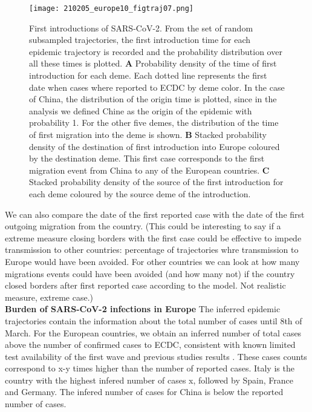 \begin{figure}[p]
    \centering
    \texttt{[image: 210205\_europe10\_figtraj07.png]}
    \caption{First introductions of SARS-CoV-2. From the set of random subsampled trajectories, the first introduction time for each epidemic trajectory is recorded and the probability distribution over all these times is plotted. \textbf{A} Probability density of the time of first introduction for each deme. Each dotted line represents the first date when cases where reported to ECDC by deme color. In the case of China, the distribution of the origin time is plotted, since in the analysis we defined Chine as the origin of the epidemic with probability 1. For the other five demes, the distribution of the time of first migration into the deme is shown. \textbf{B} Stacked probability density of the destination of first introduction into Europe coloured by the destination deme. This first case corresponds to the first migration event from China to any of the European countries. \textbf{C} Stacked probability density of the source of the first introduction for each deme coloured by the source deme of the introduction.}
    \label{fig:first}
\end{figure}


We can also compare the date of the first reported case with the date of the first outgoing migration from the country. (This could be interesting to say if a extreme measure closing borders with the first case could be effective to impede transmission to other countries: percentage of trajectories whre transmission to Europe would have been avoided. For other countries we can look at how many migrations events could have been avoided (and how many not) if the country closed borders after first reported case according to the model. Not realistic measure, extreme case.)\\ 


\textbf{Burden of SARS-CoV-2 infections in Europe}
The inferred epidemic trajectories contain the information about the total number of cases until 8th of March. For the European countries, we obtain an inferred number of total cases above the number of confirmed cases to ECDC, consistent with known limited test availability of the first wave and  previous studies results \cite{Li2020} \cite{Wu2020}. These cases counts correspond to  x-y times higher than the number of reported cases. Italy is the country with the highest infered number of cases x, followed by Spain, France and Germany. The infered number of cases for China is below the reported number of cases. \\


